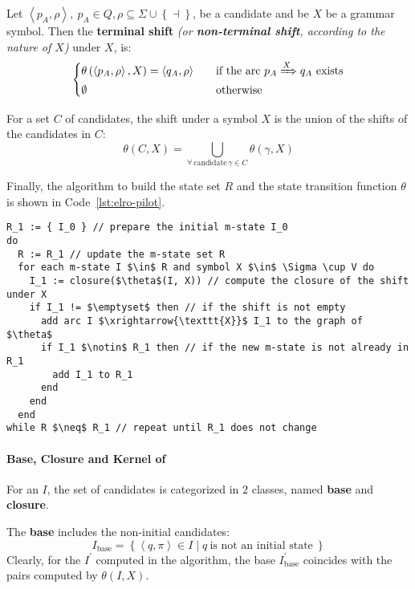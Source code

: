 \documentclass[english]{article}
\begin{document}
Let \(\left\langle p_A, \rho \right\rangle, \ p_A \in Q, \rho \subseteq \Sigma \cup \left\{ \dashv \right\}\), be a candidate and be \(X\) be a grammar symbol.
Then the \textbf{terminal shift} \textit{(or \textbf{non-terminal shift}, according to the nature of \(X\))} under \(X\), is:
\[\begin{cases}
    \theta \left( \left\langle p_A, \rho \right\rangle, X \right) = \left\langle q_A, \rho \right\rangle \quad & \text{if the arc} \ p_A \xRightarrow{X} q_A \ \text{exists} \\
    \emptyset \quad                                                                                            & \text{otherwise}
  \end{cases}\]

For a set \(C\) of candidates, the shift under a symbol \(X\) is the union of the shifts of the candidates in \(C\):
\[ \theta(C, X) = \bigcup_{\forall \, \text{candidate} \, \gamma \in C} \theta(\gamma, X) \]

Finally, the algorithm to build the state set \(R\) and the state transition function \(\theta\) is shown in Code~\ref{lst:elro-pilot}.

\begin{lstlisting}[caption={Algorithm to build the \elro pilot automaton}, label={lst:elro-pilot}]
R_1 := { I_0 } // prepare the initial m-state I_0
do
  R := R_1 // update the m-state set R
  for each m-state I $\in$ R and symbol X $\in$ \Sigma \cup V do
    I_1 := closure($\theta$(I, X)) // compute the closure of the shift under X
    if I_1 != $\emptyset$ then // if the shift is not empty
      add arc I $\xrightarrow{\texttt{X}}$ I_1 to the graph of $\theta$
      if I_1 $\notin$ R_1 then // if the new m-state is not already in R_1
        add I_1 to R_1
      end
    end
  end
while R $\neq$ R_1 // repeat until R_1 does not change
\end{lstlisting}

\paragraph[Base, Closure and Kernel of m-state]{Base, Closure and Kernel of \mstate}
\label{par:base-closure-kernel}

For an \mstate \(I\), the set of candidates is categorized in \(2\) classes, named \textbf{base} and \textbf{closure}.

The \textbf{base} includes the non-initial candidates:
\[ I_{\text{base}} = \left\{ \left\langle q, \pi \right\rangle \in I \mid q \ \text{is not an initial state} \ \right\} \]
Clearly, for the \mstate \(I^\prime\) computed in the algorithm, the base \(I^\prime_{\text{base}}\) coincides with the pairs computed by \(\theta(I, X)\).
\end{document}
